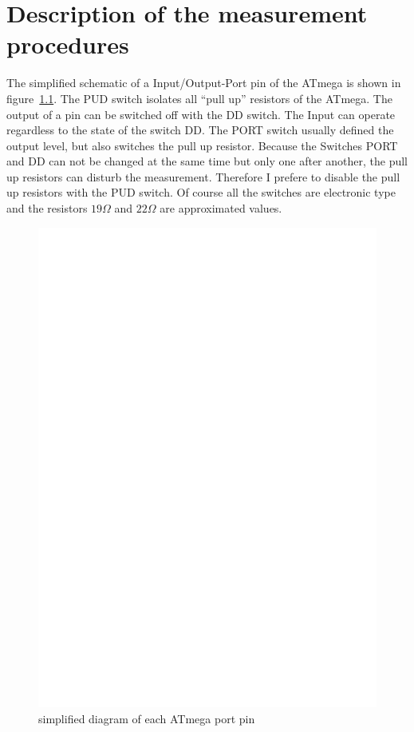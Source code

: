 \chapter{Description of the measurement procedures}
\label{sec:measurement}
The simplified schematic of a Input/Output-Port pin of the ATmega is shown in figure~\ref{fig:port}.
The PUD switch isolates all ``pull up'' resistors of the ATmega. The output of a pin can be switched off
with the DD switch. The Input can operate regardless to the state of the switch DD.
The PORT switch usually defined the output level, but also switches the pull up resistor.
Because the Switches PORT and DD can not be changed at the same time but only one after another, the
pull up resistors can disturb the measurement. Therefore I prefere to disable the pull up resistors with the
PUD switch.
Of course all the switches are electronic type and the resistors \(19\Omega\) and \(22\Omega\) are approximated values.

\begin{figure}[H]
\centering
\includegraphics[]{../FIG/port.eps}
\caption{simplified diagram of each ATmega port pin}
\label{fig:port}
\end{figure}

